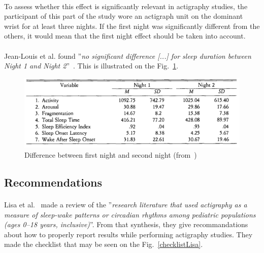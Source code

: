 \documentclass[a4paper,12pt]{article}
\begin{document}
\paragraph{}
To assess whether this effect is significantly relevant in actigraphy studies, the participant of this part of the study wore an actigraph unit on the dominant wrist for at least three nights. If the first night was significantly different from the others, it would mean that the first night effect should be taken into account.

\paragraph{}
Jean-Louis et al. found ''\textit{no significant difference [...] for sleep duration between Night 1 and Night 2}''~\cite{Jean-Louis1997a}. This is illustrated on the Fig.~\ref{firstNightEffect}.

\begin{figure}[H]
\centering
\includegraphics[scale=0.5]{Images/firstNightEffect.png}
\caption{Difference between first night and second night (from~\cite{Jean-Louis1997a})}
\label{firstNightEffect}
\end{figure}

\subsection{Recommendations}
\label{subsec:recommandations}
\paragraph{}
Lisa et al.~\cite{LisaJ.MeltzerHawleyE.Montgomery-DownsSalvatoreP.Insana2012} made a review of the ''\textit{research literature that used actigraphy as a measure of sleep-wake patterns or circadian rhythms among pediatric populations (ages 0–18 years, inclusive)}''. From that synthesis, they give recommandations about how to properly report results while performing actigraphy studies. They made the checklist that may be seen on the Fig.~\ref{checklistLisa}.
\end{document}
